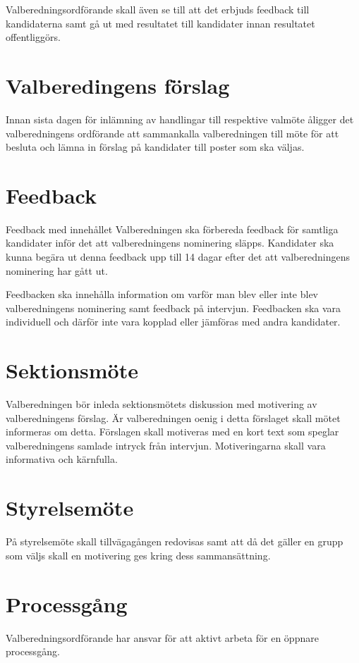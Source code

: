 \documentclass{dsekprotokoll}
\begin{document}
Valberedningsordförande skall även se till att det erbjuds feedback till kandidaterna samt gå
ut med resultatet till kandidater innan resultatet offentliggörs.

\section{Valberedingens förslag}
Innan sista dagen för inlämning av handlingar till respektive valmöte åligger det valberedningens ordförande att sammankalla valberedningen till möte för att besluta och lämna in förslag
på kandidater till poster som ska väljas.

\section{Feedback}
Feedback med innehållet Valberedningen ska förbereda feedback för samtliga kandidater inför det att valberedningens nominering
släpps. Kandidater ska kunna begära ut denna feedback upp till 14 dagar efter det att valberedningens nominering har gått ut.

Feedbacken ska innehålla information om varför man blev eller inte blev valberedningens nominering samt feedback på intervjun. Feedbacken ska vara individuell och därför inte vara kopplad eller
jämföras med andra kandidater.

\section{Sektionsmöte}
Valberedningen bör inleda sektionsmötets diskussion med motivering av valberedningens förslag. Är valberedningen oenig i detta förslaget skall mötet informeras om detta. Förslagen skall
motiveras med en kort text som speglar valberedningens samlade intryck från intervjun. Motiveringarna skall vara informativa och kärnfulla.

\section{Styrelsemöte}
På styrelsemöte skall tillvägagången redovisas samt att då det gäller en grupp som väljs skall
en motivering ges kring dess sammansättning.

\section{Processgång}
Valberedningsordförande har ansvar för att aktivt arbeta för en öppnare processgång.
\end{document}

